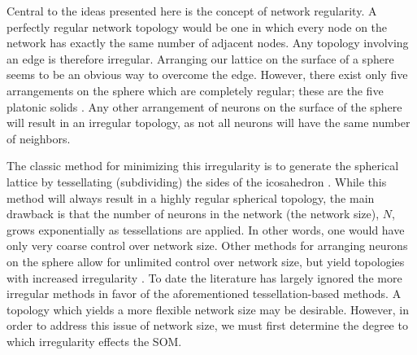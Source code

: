 Central to the ideas presented here is the concept of network regularity. A
perfectly regular network topology would be one in which every node on the
network has exactly the same number of adjacent nodes.  Any topology involving
an edge is therefore irregular.  Arranging our lattice on the surface of a
sphere seems to be an obvious way to overcome the edge.  However, there exist
only five arrangements on the sphere which are completely regular; these are
the five platonic solids \citep{ritter99, harris2000}.  Any other arrangement
of neurons on the surface of the sphere will result in an irregular topology,
as not all neurons will have the same number of neighbors.

The classic method for minimizing this irregularity is to generate the
spherical lattice by tessellating (subdividing) the sides of the icosahedron
\citep{Nishio:2006fk}.  While this method will always result in a highly
regular spherical topology, the main drawback is that the number of neurons in
the network (the network size), \(N\), grows exponentially as tessellations
are applied. In other words, one would have only very coarse control over
network size.  Other methods for arranging neurons on the sphere allow for
unlimited control over network size, but yield topologies with increased
irregularity \citep{harris2000, wu2005, Nishio:2006fk}.  To date the
literature has largely ignored the more irregular methods in favor of the
aforementioned tessellation-based methods.  A topology which yields a more
flexible network size may be desirable.  However, in order to address this
issue of network size, we must first determine the degree to which
irregularity effects the SOM.
